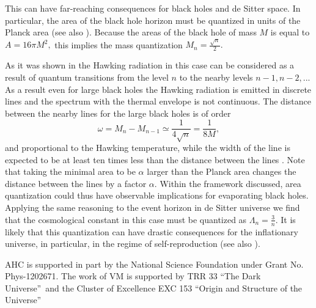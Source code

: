 \documentclass
[twocolumn,prl,unsortedaddress,superscriptaddress,showpacs]{revtex4}%
\begin{document}
This can have far-reaching consequences for black holes and de Sitter space.
In particular, the area of the black hole horizon must be quantized in units
of the Planck area (see also \cite{BM1}). Because the areas of the black hole
of mass $M$ is equal to $A=16\pi M^{2},$ this implies the mass quantization
$M_{n}=\frac{\sqrt{n}}{2}.$

As it was shown in \cite{BM2} the Hawking radiation in this case can be
considered as a result of quantum transitions from the level $n$ to the nearby
levels $n-1,n-2,...$ As a result even for large black holes the Hawking
radiation is emitted in discrete lines and the spectrum with the thermal
envelope is not continuous. The distance between the nearby lines for the
large black holes is of order
\begin{equation}
\omega=M_{n}-M_{n-1}\simeq\frac{1}{4\sqrt{n}}=\frac{1}{8M}, \label{27}%
\end{equation}
and proportional to the Hawking temperature, while the width of the line is
expected to be at least ten times less than the distance between the lines
\cite{BM2}. Note that taking the minimal area to be $\alpha$ larger than the
Planck area changes the distance between the lines by a factor $\alpha.$
Within the framework discussed, area quantization could thus have observable
implications for evaporating black holes. Applying the same reasoning to the
event horizon in de Sitter universe we find that the cosmological constant in
this case must be quantized as $\Lambda_{n}=\frac{3}{n}.$ It is likely that
this quantization can have drastic consequences for the inflationary universe,
in particular, in the regime of self-reproduction (see also \cite{Gomez}).

\begin{acknowledgments}
AHC is supported in part by the National Science Foundation under Grant No.
Phys-1202671. The work of VM is supported by TRR 33 \textquotedblleft The Dark
Universe\textquotedblright\ and the Cluster of Excellence EXC 153
\textquotedblleft Origin and Structure of the Universe\textquotedblright
\end{acknowledgments}

\bigskip
\end{document}
